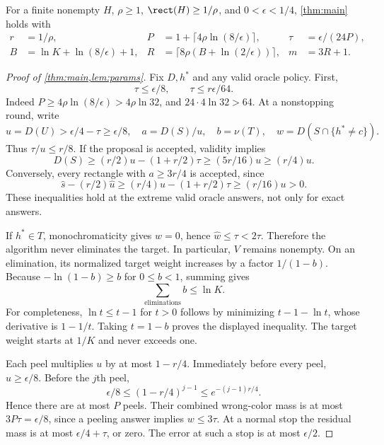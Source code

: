 \begin{lemma}\label{lem:params}
For a finite nonempty $H$, $\rho\ge1$, $\rect(H)\ge1/\rho$, and $0<\epsilon<1/4$, \cref{thm:main} holds with
\begin{align}
 r&=1/\rho,&P&=1+\lceil4\rho\ln(8/\epsilon)\rceil,&\tau&=\epsilon/(24P),\label{eq:params1}\\
 B&=\ln K+\ln(8/\epsilon)+1,&R&=\lceil8\rho(B+\ln(2/\epsilon))\rceil,&m&=3R+1.\label{eq:params2}
\end{align}
\end{lemma}

\begin{proof}[Proof of \cref{thm:main,lem:params}]
Fix $D,h^*$ and any valid oracle policy. First,
\begin{equation}\label{eq:tau-small}
 \tau\le\epsilon/8,\qquad \tau\le r\epsilon/64.
\end{equation}
Indeed $P\ge4\rho\ln(8/\epsilon)>4\rho\ln32$, and $24\cdot4\ln32>64$. At a nonstopping round, write
\[
 u=D(U)>\epsilon/4-\tau\ge\epsilon/8,
 \quad a=D(S)/u,\quad b=\nu(T),\quad w=D(S\cap\{h^*\ne c\}).
\]
Thus $\tau/u\le r/8$. If the proposal is accepted, validity implies
\[
 D(S)\ge(r/2)u-(1+r/2)\tau\ge(5r/16)u\ge(r/4)u.
\]
Conversely, every rectangle with $a\ge3r/4$ is accepted, since
\[
 \widehat s-(r/2)\widehat u
 \ge(r/4)u-(1+r/2)\tau\ge(r/16)u>0.
\]
These inequalities hold at the extreme valid oracle answers, not only for exact answers.

If $h^*\in T$, monochromaticity gives $w=0$, hence $\widehat w\le\tau<2\tau$. Therefore the algorithm never eliminates the target. In particular, $V$ remains nonempty. On an elimination, its normalized target weight increases by a factor $1/(1-b)$. Because $-\ln(1-b)\ge b$ for $0\le b<1$, summing gives
\begin{equation}\label{eq:elim-budget}
 \sum_{\text{eliminations}} b\le\ln K.
\end{equation}
For completeness, $\ln t\le t-1$ for $t>0$ follows by minimizing $t-1-\ln t$, whose derivative is $1-1/t$. Taking $t=1-b$ proves the displayed inequality. The target weight starts at $1/K$ and never exceeds one.

Each peel multiplies $u$ by at most $1-r/4$. Immediately before every peel, $u\ge\epsilon/8$. Before the $j$th peel,
\[
 \epsilon/8\le(1-r/4)^{j-1}\le e^{-(j-1)r/4}.
\]
Hence there are at most $P$ peels. Their combined wrong-color mass is at most $3P\tau=\epsilon/8$, since a peeling answer implies $w\le3\tau$. At a normal stop the residual mass is at most $\epsilon/4+\tau$, or zero. The error at such a stop is at most $\epsilon/2$.


\end{proof}
